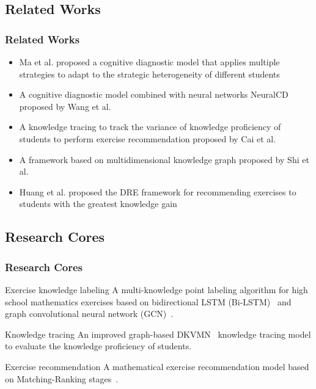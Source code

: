 \documentclass[10pt,aspectratio=43,mathserif]{beamer}
\begin{document}
\subsection{Related Works}
\begin{frame}
	\frametitle{Related Works}
	\begin{itemize}
		\item Ma et al. proposed a cognitive diagnostic model that applies multiple strategies to adapt to the strategic heterogeneity of different students~\cite{Ma2019MCDM}
		\item A cognitive diagnostic model combined with neural networks NeuralCD proposed by Wang et al.~\cite{wang2020neural}
		\item A knowledge tracing to track the variance of knowledge proficiency of students to perform exercise recommendation proposed by Cai et al.~\cite{9064104}
		\item A framework based on multidimensional knowledge graph proposed by Shi et al.~\cite{SHI2020105618}
		\item Huang et al. proposed the DRE framework for recommending exercises to students with the greatest knowledge gain~\cite{DRE2019Huang}
	\end{itemize}
\end{frame}




\subsection{Research Cores}
\begin{frame}
	\frametitle{Research Cores}
	\begin{block}{Exercise knowledge labeling}
		A multi-knowledge point labeling algorithm for high school mathematics exercises based on bidirectional LSTM (Bi-LSTM)~\cite{chen2017improving} and graph convolutional neural network (GCN)~\cite{kipf2016semi}.
	\end{block}
	\begin{block}{Knowledge tracing}
		An improved graph-based DKVMN~\cite{zhang2017dynamic} knowledge tracing model to evaluate the knowledge proficiency of students.
	\end{block}
	\begin{block}{Exercise recommendation}
		A mathematical exercise recommendation model based on Matching-Ranking stages~\cite{segev2009context}.
	\end{block}
\end{frame}
\end{document}
